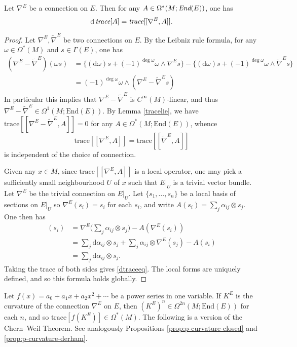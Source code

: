 \documentclass[a4paper,openany]{scrbook}
\newcommand{\ud}{\mathrm{d}}
\begin{document}
\begin{lemma}\label{dtrace}
Let $\nabla^E$ be a connection on $E$. Then for any $A\in\Omega^*(M;\emph{End}(E))$, one has
\begin{equation}\label{dtraceeq}
\ud\,\emph{trace}[A]=\emph{trace}[[\nabla^E,A]].
\end{equation}
\end{lemma}
\begin{proof}
Let $\nabla^E,\tilde{\nabla}^E$ be two connections on $E$. By the Leibniz rule formula, for any $\omega\in\Omega^*(M)$ and $s\in\Gamma(E)$, one has
\begin{align*}
(\nabla^E-\tilde{\nabla}^E)(\omega s)&=\{(\ud\omega)s+(-1)^{\deg\omega}\omega\wedge\nabla^Es\}-\{(\ud\omega)s+(-1)^{\deg\omega}\omega\wedge\tilde{\nabla}^Es\}\\
&=(-1)^{\deg\omega}\omega\wedge(\nabla^E-\tilde{\nabla}^Es)
\end{align*}
In particular this implies that $\nabla^E-\tilde{\nabla}^E$ is $C^\infty(M)$-linear, and thus $\nabla^E-\tilde{\nabla}^E\in\Omega^1(M;\text{End}(E))$. By Lemma \ref{tracelie}, we have $\text{trace}[[\nabla^E-\tilde{\nabla}^E,A]]=0$ for any $A\in\Omega^*(M;\text{End}(E))$, whence
\begin{equation}
\text{trace}[[\nabla^E,A]]=\text{trace}[[\tilde{\nabla}^E,A]]
\end{equation}
is independent of the choice of connection.

Given any $x\in M$, since $\text{trace}[[\nabla^E,A]]$ is a local operator, one may pick a sufficiently small neighbourhood $U$ of $x$ such that $E|_U$ is a trivial vector bundle. Let $\nabla^E$ be the trivial connection on $E|_U$. Let $\{s_1,\dots,s_n\}$ be a local basis of sections on $E|_U$ so $\nabla^E(s_i)=s_i$ for each $s_i$, and write $A(s_i)=\sum_j\alpha_{ij}\otimes s_j$. One then has 
\begin{align*}
[\nabla^E,A](s_i)&=\nabla^E\Big(\sum_j\alpha_{ij}\otimes s_j\Big)-A(\nabla^E(s_i))\\
&=\sum_j\ud\alpha_{ij}\otimes s_j+\sum_j\alpha_{ij}\otimes\nabla^E(s_j)-A(s_i)\\
&=\sum_j\ud\alpha_{ij}\otimes s_j.
\end{align*}
Taking the trace of both sides gives \eqref{dtraceeq}. The local forms are uniquely defined, and so this formula holds globally.
\end{proof}


Let $f(x)=a_0+a_1x+a_2x^2+\cdots$ be a power series in one variable. If $K^E$ is the curvature of the connection $\nabla^E$ on $E$, then $(K^E)^n\in\Omega^{2n}(M;\text{End}(E))$ for each $n$, and so $\text{trace}[f(K^E)]\in\Omega^*(M)$. The following is a version of the Chern--Weil Theorem. See analogously Propositions \ref{prop:p-curvature-closed} and \ref{prop:p-curvature-derham}.
\end{document}
